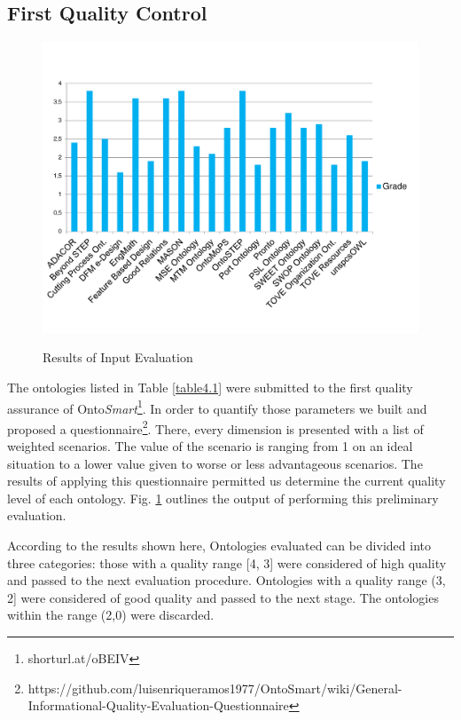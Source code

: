 \subsection{First Quality Control}\label{subsection4.2.2}

\begin{figure}
	\begin{center}
		\includegraphics[scale=0.5]{figure-chapterIV/fig4-1.pdf}\\
		\caption{Results of Input Evaluation}
		\label{figure4-1}
	\end{center}
\end{figure}

The ontologies listed in Table \ref{table4.1} were submitted to the first quality assurance of Onto\textit{Smart}\footnote{shorturl.at/oBEIV}. In order to quantify those parameters we built and proposed a questionnaire\footnote{https://github.com/luisenriqueramos1977/OntoSmart/wiki/General-Informational-Quality-Evaluation-Questionnaire}. There, every dimension is presented with a list of weighted scenarios. The value of the scenario is ranging from 1 on an ideal situation to a lower value given to worse or less advantageous scenarios. The results of applying this questionnaire permitted us determine the current quality level of each ontology. Fig. \ref{figure4-1} outlines the output of performing this preliminary evaluation. 

According to the results shown here, Ontologies evaluated can be divided into three categories: those with a quality range [4, 3] were considered of high quality and passed to the next evaluation procedure. Ontologies with a quality range (3, 2] were considered of good quality and passed to the next stage. The ontologies within the range (2,0) were discarded.   


